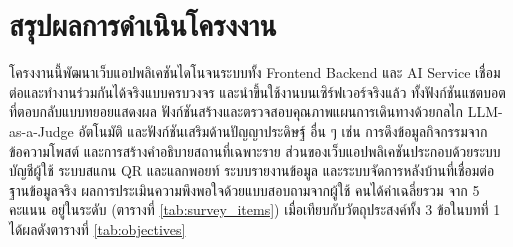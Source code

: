 
\section{สรุปผลการดำเนินโครงงาน}

โครงงานนี้พัฒนาเว็บแอปพลิเคชันไดโนจนระบบทั้ง Frontend Backend และ AI Service เชื่อมต่อและทำงานร่วมกันได้จริงแบบครบวงจร และนำขึ้นใช้งานบนเซิร์ฟเวอร์จริงแล้ว ทั้งฟังก์ชันแชตบอตที่ตอบกลับแบบทยอยแสดงผล ฟังก์ชันสร้างและตรวจสอบคุณภาพแผนการเดินทางด้วยกลไก LLM-as-a-Judge อัตโนมัติ และฟังก์ชันเสริมด้านปัญญาประดิษฐ์ อื่น ๆ เช่น การดึงข้อมูลกิจกรรมจากข้อความโพสต์ และการสร้างคำอธิบายสถานที่เฉพาะราย ส่วนของเว็บแอปพลิเคชันประกอบด้วยระบบบัญชีผู้ใช้ ระบบสแกน QR และแลกพอยท์ ระบบรายงานข้อมูล และระบบจัดการหลังบ้านที่เชื่อมต่อฐานข้อมูลจริง ผลการประเมินความพึงพอใจด้วยแบบสอบถามจากผู้ใช้ \surveyN{} คนได้ค่าเฉลี่ยรวม \surveyOverallMean{} จาก 5 คะแนน อยู่ในระดับ\surveyOverallLevel{} (ตารางที่ \ref{tab:survey_items}) เมื่อเทียบกับวัตถุประสงค์ทั้ง 3 ข้อในบทที่ 1 ได้ผลดังตารางที่ \ref{tab:objectives}

